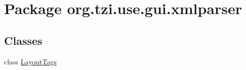 \hypertarget{namespaceorg_1_1tzi_1_1use_1_1gui_1_1xmlparser}{\section{Package org.\-tzi.\-use.\-gui.\-xmlparser}
\label{namespaceorg_1_1tzi_1_1use_1_1gui_1_1xmlparser}
}
\subsection*{Classes}
\begin{DoxyCompactItemize}
\item 
class \hyperlink{classorg_1_1tzi_1_1use_1_1gui_1_1xmlparser_1_1_layout_tags}{Layout\-Tags}
\end{DoxyCompactItemize}
